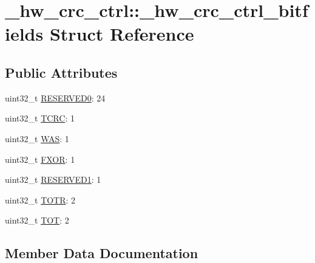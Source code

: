 \hypertarget{struct__hw__crc__ctrl_1_1__hw__crc__ctrl__bitfields}{}\section{\+\_\+hw\+\_\+crc\+\_\+ctrl\+:\+:\+\_\+hw\+\_\+crc\+\_\+ctrl\+\_\+bitfields Struct Reference}
\label{struct__hw__crc__ctrl_1_1__hw__crc__ctrl__bitfields}
\subsection*{Public Attributes}
\begin{DoxyCompactItemize}
\item 
uint32\+\_\+t \hyperlink{struct__hw__crc__ctrl_1_1__hw__crc__ctrl__bitfields_a5721cac267650adc7db58f3b1ed06a3e}{R\+E\+S\+E\+R\+V\+E\+D0}\+: 24
\item 
uint32\+\_\+t \hyperlink{struct__hw__crc__ctrl_1_1__hw__crc__ctrl__bitfields_a2043e2f655f9f683677aa7fab6085c95}{T\+C\+RC}\+: 1
\item 
uint32\+\_\+t \hyperlink{struct__hw__crc__ctrl_1_1__hw__crc__ctrl__bitfields_aa7eab0c795f4742591ee238499b9871c}{W\+AS}\+: 1
\item 
uint32\+\_\+t \hyperlink{struct__hw__crc__ctrl_1_1__hw__crc__ctrl__bitfields_a183bf7228619949cfd577fa375d5684d}{F\+X\+OR}\+: 1
\item 
uint32\+\_\+t \hyperlink{struct__hw__crc__ctrl_1_1__hw__crc__ctrl__bitfields_a84efb567e285eed4bb730f8613ece1a2}{R\+E\+S\+E\+R\+V\+E\+D1}\+: 1
\item 
uint32\+\_\+t \hyperlink{struct__hw__crc__ctrl_1_1__hw__crc__ctrl__bitfields_acb23e8028a3f584bd64b91727e1949bf}{T\+O\+TR}\+: 2
\item 
uint32\+\_\+t \hyperlink{struct__hw__crc__ctrl_1_1__hw__crc__ctrl__bitfields_a0e96e19d1fbd835725e35e6b388f4266}{T\+OT}\+: 2
\end{DoxyCompactItemize}


\subsection{Member Data Documentation}
